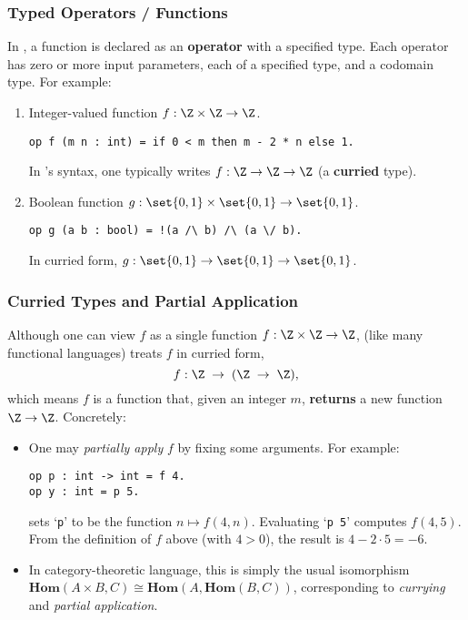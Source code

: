\subsubsection{Typed Operators / Functions}
In \EasyCrypt, a function is declared as an \textbf{operator} with a specified type. Each operator has zero or more input parameters, each of a specified type, and a codomain type. For example:
\begin{enumerate}
	\item Integer-valued function \(f: \Z\times \Z\to \Z\).\\
\begin{lstlisting}[style=easycrypt]
op f (m n : int) = if 0 < m then m - 2 * n else 1.
\end{lstlisting} In \EasyCrypt’s syntax, one typically writes $f:\Z\to\Z\to\Z$ (a \textbf{curried} type).
	\item Boolean function \(g:\set{0,1}\times\set{0,1}\to\set{0,1}\).\\
\begin{lstlisting}[style=easycrypt]
op g (a b : bool) = !(a /\ b) /\ (a \/ b).
\end{lstlisting} In curried form, \(g : \set{0,1} \to \set{0,1} \to \set{0,1}\).
\end{enumerate}
\vfill
\subsubsection{Curried Types and Partial Application}
Although one can view \(f\) as a single function \(f : \Z\times\Z\to\Z\), \EasyCrypt (like many functional languages) treats \(f\) in curried form,
\[
f : \Z\;\to\; (\Z \;\to\; \Z),
\]
which means \(f\) is a function that, given an integer \(m\), \textbf{returns} a new function \(\Z\to\Z\). Concretely:
\begin{itemize}
	\item One may \textit{partially apply} \(f\) by fixing some arguments. For example:\\
\begin{lstlisting}[style=easycrypt]
op p : int -> int = f 4.
op y : int = p 5.
\end{lstlisting}
sets `\texttt{p}' to be the function \(n \mapsto f(4,n)\). Evaluating `\texttt{p 5}' computes \(f(4,5)\). From the definition of \(f\) above (with \(4>0\)), the result is \(4 - 2\cdot 5 = -6\).
	\item In category-theoretic language, this is simply the usual isomorphism \(\mathbf{Hom}(A \times B, C) \cong \mathbf{Hom}(A, \mathbf{Hom}(B,C))\), corresponding to \textit{currying} and \textit{partial application}.
\end{itemize}

